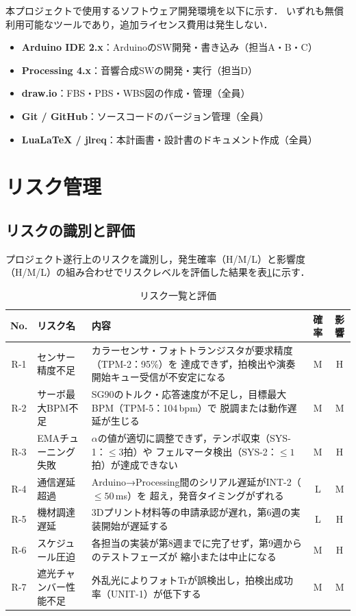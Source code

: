 本プロジェクトで使用するソフトウェア開発環境を以下に示す．
いずれも無償利用可能なツールであり，追加ライセンス費用は発生しない．

\begin{itemize}
  \item \textbf{Arduino IDE 2.x}：ArduinoのSW開発・書き込み（担当A・B・C）
  \item \textbf{Processing 4.x}：音響合成SWの開発・実行（担当D）
  \item \textbf{draw.io}：FBS・PBS・WBS図の作成・管理（全員）
  \item \textbf{Git / GitHub}：ソースコードのバージョン管理（全員）
  \item \textbf{LuaLaTeX / jlreq}：本計画書・設計書のドキュメント作成（全員）
\end{itemize}

\section{リスク管理}

\subsection{リスクの識別と評価}

プロジェクト遂行上のリスクを識別し，発生確率（H/M/L）と影響度（H/M/L）の組み合わせでリスクレベルを評価した結果を表\ref{tab:risk}に示す．

\begin{table}[H]
  \centering
  \caption{リスク一覧と評価}
  \label{tab:risk}
  \begin{tabularx}{\linewidth}{clXcc}
    \toprule
    No. & リスク名 & 内容 & 確率 & 影響 \\
    \midrule
    R-1 & センサー精度不足 &
      カラーセンサ・フォトトランジスタが要求精度（TPM-2：95\%）を
      達成できず，拍検出や演奏開始キュー受信が不安定になる &
      M & H \\
    R-2 & サーボ最大BPM不足 &
      SG90のトルク・応答速度が不足し，目標最大BPM（TPM-5：104\,bpm）で
      脱調または動作遅延が生じる &
      M & M \\
    R-3 & EMAチューニング失敗 &
      $\alpha$の値が適切に調整できず，テンポ収束（SYS-1：$\leq3$拍）や
      フェルマータ検出（SYS-2：$\leq1$拍）が達成できない &
      M & H \\
    R-4 & 通信遅延超過 &
      Arduino→Processing間のシリアル遅延がINT-2（$\leq50\,$ms）を
      超え，発音タイミングがずれる &
      L & M \\
    R-5 & 機材調達遅延 &
      3Dプリント材料等の申請承認が遅れ，第6週の実装開始が遅延する &
      L & H \\
    R-6 & スケジュール圧迫 &
      各担当の実装が第8週までに完了せず，第9週からのテストフェーズが
      縮小または中止になる &
      M & H \\
    R-7 & 遮光チャンバー性能不足 &
      外乱光によりフォトTrが誤検出し，拍検出成功率（UNIT-1）が低下する &
      M & M \\
    \bottomrule
  \end{tabularx}
\end{table}

